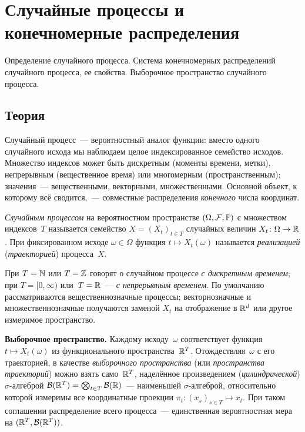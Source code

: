 
\section{Случайные процессы и конечномерные распределения}
\label{sec:1.2.07-stochastic-processes}

\begin{ticket}
Определение случайного процесса. Система конечномерных распределений случайного процесса, ее свойства. Выборочное пространство случайного процесса.
\end{ticket}

\subsection*{Теория}

Случайный процесс~--- вероятностный аналог функции: вместо одного случайного исхода мы наблюдаем целое индексированное семейство исходов. Множество индексов может быть дискретным (моменты времени, метки), непрерывным (вещественное время) или многомерным (пространственным); значения~--- вещественными, векторными, множественными. Основной объект, к которому всё сводится,~--- совместные распределения \emph{конечного} числа координат.

\begin{definition}
\label{def:stochastic-process}
\emph{Случайным процессом} на вероятностном пространстве $(\Omega, \mathcal{F}, \mathbb{P})$ с множеством индексов~$T$ называется семейство $X = (X_t)_{t \in T}$ случайных величин $X_t \colon \Omega \to \mathbb{R}$. При фиксированном исходе $\omega \in \Omega$ функция $t \mapsto X_t(\omega)$ называется \emph{реализацией} (\emph{траекторией}) процесса~$X$.
\end{definition}

При $T = \mathbb{N}$ или $T = \mathbb{Z}$ говорят о случайном процессе \emph{с дискретным временем}; при $T = [0, \infty)$ или~$T = \mathbb{R}$~--- \emph{с непрерывным временем}. По умолчанию рассматриваются вещественнозначные процессы; векторнозначные и множественнозначные получаются заменой $X_t$ на отображение в $\mathbb{R}^d$ или другое измеримое пространство.

\medskip
\noindent\textbf{Выборочное пространство.} Каждому исходу~$\omega$ соответствует функция $t \mapsto X_t(\omega)$ из функционального пространства~$\mathbb{R}^T$. Отождествляя~$\omega$ с его траекторией, в качестве \emph{выборочного пространства} (или \emph{пространства траекторий}) можно взять само~$\mathbb{R}^T$, наделённое произведением (\emph{цилиндрической}) $\sigma$-алгеброй $\mathcal{B}(\mathbb{R}^T) = \bigotimes_{t \in T} \mathcal{B}(\mathbb{R})$~--- наименьшей $\sigma$-алгеброй, относительно которой измеримы все координатные проекции $\pi_t \colon (x_s)_{s \in T} \mapsto x_t$. При таком соглашении распределение всего процесса~--- единственная вероятностная мера на $(\mathbb{R}^T, \mathcal{B}(\mathbb{R}^T))$.

